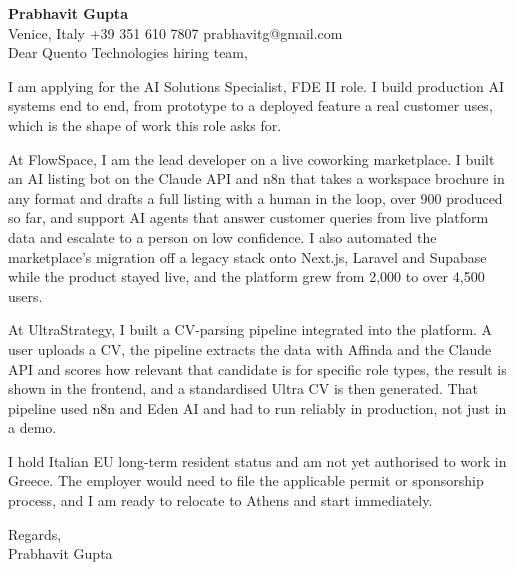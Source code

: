 \documentclass[a4paper,10.5pt]{article}
\begin{document}
\textbf{Prabhavit Gupta}\\
Venice, Italy \textbar{} +39 351 610 7807 \textbar{} prabhavitg@gmail.com\\[10pt]
Dear Quento Technologies hiring team,

I am applying for the AI Solutions Specialist, FDE II role. I build production AI systems end to end, from prototype to a deployed feature a real customer uses, which is the shape of work this role asks for.

At FlowSpace, I am the lead developer on a live coworking marketplace. I built an AI listing bot on the Claude API and n8n that takes a workspace brochure in any format and drafts a full listing with a human in the loop, over 900 produced so far, and support AI agents that answer customer queries from live platform data and escalate to a person on low confidence. I also automated the marketplace's migration off a legacy stack onto Next.js, Laravel and Supabase while the product stayed live, and the platform grew from 2,000 to over 4,500 users.

At UltraStrategy, I built a CV-parsing pipeline integrated into the platform. A user uploads a CV, the pipeline extracts the data with Affinda and the Claude API and scores how relevant that candidate is for specific role types, the result is shown in the frontend, and a standardised Ultra CV is then generated. That pipeline used n8n and Eden AI and had to run reliably in production, not just in a demo.

I hold Italian EU long-term resident status and am not yet authorised to work in Greece. The employer would need to file the applicable permit or sponsorship process, and I am ready to relocate to Athens and start immediately.

Regards,\\
Prabhavit Gupta
\end{document}
